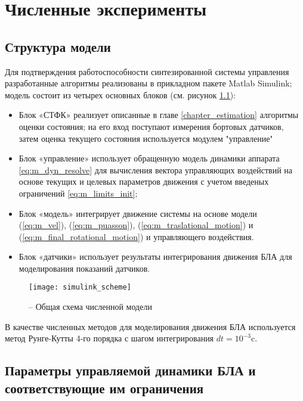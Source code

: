 
\chapter{Численные эксперименты}
\label{experiments_chapter}

\section{Структура модели}

Для подтверждения работоспособности синтезированной системы управления разработанные алгоритмы реализованы в прикладном пакете Matlab Simulink; модель состоит из четырех основных блоков (см. рисунок \ref{fig:simulink_scheme}):
\begin{itemize}
	\item Блок «СТФК» реализует описанные в главе \ref{chapter_estimation} алгоритмы оценки состояния; на его вход поступают измерения бортовых датчиков, затем оценка текущего состояния используется модулем "управление"
	\item Блок «управление» использует обращенную модель динамики аппарата \ref{eq:m_dyn_resolve} для вычисления вектора управляющих воздействий на основе текущих и целевых параметров движения с учетом введеных ограничений \ref{eq:m_limits_init};
	\item Блок «модель» интегрирует движение системы на основе модели
	(\ref{eq:m_vel}), (\ref{eq:m_puasson}), (\ref{eq:m_traslational_motion}) и (\ref{eq:m_final_rotational_motion})
	и управляющего воздействия.
	\item Блок «датчики» использует результаты интегрирования движения БЛА для моделирования показаний датчиков.
\end{itemize}
\begin{figure}[h!]
	\centering
	\texttt{[image: simulink\_scheme]}
	\caption{ -- Общая схема численной модели}
	\label{fig:simulink_scheme}
\end{figure}
В качестве численных методов для моделирования движения БЛА используется метод Рунге-Кутты 4-го порядка с шагом интегрирования $dt={10^{-3}}$c.

\section{Параметры управляемой динамики БЛА и соответствующие им ограничения}

